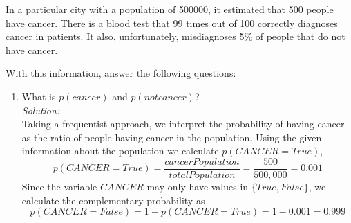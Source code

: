 \documentclass{../amsml}
\begin{document}
\begin{problem}
In a particular city with a population of 500000, it estimated that 500 people have cancer. There is a blood test that 99 times out of 100 correctly diagnoses cancer in patients. It also, unfortunately, misdiagnoses 5\% of people that do not have cancer. 

With this information, answer the following questions:

\begin{enumerate}
	\item What is $p(cancer)$ and $p(not cancer)$? \\
		\emph{Solution:} \\
			Taking a frequentist approach, we interpret the probability of having cancer as the ratio of people having cancer in the population. Using the given information about the population we calculate $p(CANCER = True)$, 
				\begin{equation}\label{eq: pCancer}
					p(CANCER = True) = \frac{cancerPopulation}{totalPopulation} = \frac{500}{500,000} = 0.001
				\end{equation} 
			Since the variable $CANCER$ may only have values in $\{True, False\}$, we calculate the complementary probability as 
				\begin{equation} \label{eq: pNotCancer}
					p(CANCER = False) = 1 - p(CANCER = True) = 1 - 0.001 = 0.999
				\end{equation}
				

\end{enumerate}
\end{problem}
\end{document}
